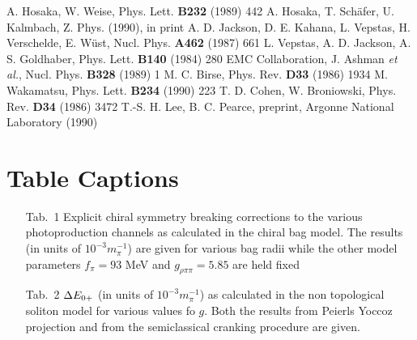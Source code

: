 \begin{thebibliography}{99}
 A. Hosaka, W. Weise, Phys. Lett. {\bf B232} (1989) 442 
 A. Hosaka, T. Sch\"afer, U. Kalmbach, Z. Phys. (1990), in print
 A. D. Jackson, D. E. Kahana, L. Vepstas, H. Verschelde, E.
              W\"ust, Nucl. Phys. {\bf A462} (1987) 661
 L. Vepstas, A. D. Jackson, A. S.	Goldhaber, Phys. Lett.
              {\bf B140} (1984) 280	                          
 EMC Collaboration, J. Ashman {\em et al.}, Nucl. Phys. {\bf B328}
              (1989) 1
 M. C. Birse, Phys. Rev. {\bf D33} (1986) 1934
 M. Wakamatsu, Phys. Lett. {\bf B234} (1990) 223
 T. D. Cohen, W. Broniowski, Phys. Rev. {\bf D34 } (1986) 3472
 T.-S. H. Lee, B. C. Pearce, preprint, 
              Argonne National Laboratory (1990) 
	      
\end{thebibliography}
\newpage
\section*{Table Captions}
\begin{itemize}
\item[Tab.\ 1]{Explicit chiral symmetry breaking corrections to
the various photoproduction channels as calculated in the chiral
bag model. The results (in units of $10^{-3}m_\pi^{-1}$) 
are given for various bag radii while the
other model parameters $f_{\pi}=93$ MeV and $g_{\rho\pi\pi}=5.85$
are held fixed}
\item[Tab.\ 2]{$\Delta E_{0+}$  (in units of $10^{-3}m_\pi^{-1}$) 
as calculated in the non topological soliton
model for various values fo $g$. Both the results from Peierls Yoccoz
projection and from the semiclassical cranking procedure are given.}
\end{itemize}
